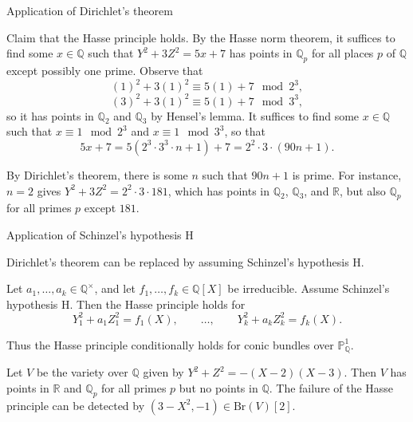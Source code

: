 \documentclass[10pt]{beamer}
\begin{document}
\begin{frame}[t]{Application of Dirichlet's theorem}

\begin{example}[$ Y^2 + 3Z^2 = 5X + 7 $]
Claim that the Hasse principle holds. \pause By the Hasse norm theorem, it suffices to find some $ x \in \mathbb{Q} $ such that $ Y^2 + 3Z^2 = 5x + 7 $ has points in $ \mathbb{Q}_p $ for all places $ p $ of $ \mathbb{Q} $ except possibly one prime. \pause Observe that
$$ (1)^2 + 3(1)^2 \equiv 5(1) + 7 \mod 2^3, $$
$$ (3)^2 + 3(1)^2 \equiv 5(1) + 7 \mod 3^3, $$
so it has points in $ \mathbb{Q}_2 $ and $ \mathbb{Q}_3 $ by Hensel's lemma. \pause It suffices to find some $ x \in \mathbb{Q} $ such that $ x \equiv 1 \mod 2^3 $ and $ x \equiv 1 \mod 3^3 $, so that
$$ 5x + 7 = 5(2^3 \cdot 3^3 \cdot n + 1) + 7 = 2^2 \cdot 3 \cdot (90n + 1). $$

\pause

By Dirichlet's theorem, there is some $ n $ such that $ 90n + 1 $ is prime. \pause For instance, $ n = 2 $ gives $ Y^2 + 3Z^2 = 2^2 \cdot 3 \cdot 181 $, which has points in $ \mathbb{Q}_2 $, $ \mathbb{Q}_3 $, and $ \mathbb{R} $, but also $ \mathbb{Q}_p $ for all primes $ p $ except $ 181 $.
\end{example}

\end{frame}

\begin{frame}[t]{Application of Schinzel's hypothesis H}

Dirichlet's theorem can be replaced by assuming Schinzel's hypothesis H.

\pause

\vspace{0.5cm}

\begin{theorem}
Let $ a_1, \dots, a_k \in \mathbb{Q}^\times $, and let $ f_1, \dots, f_k \in \mathbb{Q}[X] $ be irreducible. Assume Schinzel's hypothesis H. Then the Hasse principle holds for
$$ Y_1^2 + a_1Z_1^2 = f_1(X), \qquad \dots, \qquad Y_k^2 + a_kZ_k^2 = f_k(X). $$
\end{theorem}

\pause

Thus the Hasse principle conditionally holds for conic bundles over $ \mathbb{P}_\mathbb{Q}^1 $.

\pause

\vspace{0.5cm}

\begin{example}[Iskovskikh, 1971]
Let $ V $ be the variety over $ \mathbb{Q} $ given by $ Y^2 + Z^2 = -(X - 2)(X - 3) $. Then $ V $ has points in $ \mathbb{R} $ and $ \mathbb{Q}_p $ for all primes $ p $ but no points in $ \mathbb{Q} $. \pause The failure of the Hasse principle can be detected by $ (3 - X^2, - 1) \in \mathrm{Br}(V)[2] $.
\end{example}

\end{frame}
\end{document}
